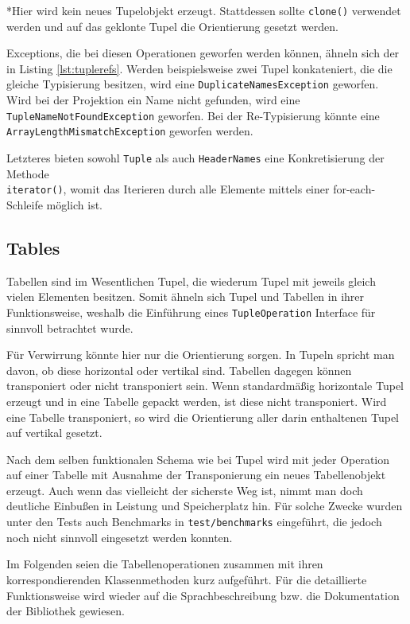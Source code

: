 *Hier wird kein neues Tupelobjekt erzeugt. Stattdessen sollte \lstinline{clone()} verwendet werden und auf das geklonte Tupel die Orientierung gesetzt werden.

Exceptions, die bei diesen Operationen geworfen werden können, ähneln sich der in Listing \ref{lst:tuplerefs}. Werden
beispielsweise zwei Tupel konkateniert, die die gleiche Typisierung besitzen, wird eine \lstinline{DuplicateNamesException} geworfen.
Wird bei der Projektion ein Name nicht gefunden, wird eine \lstinline{TupleNameNotFoundException} geworfen. Bei der Re-Typisierung
könnte eine\\
\lstinline{ArrayLengthMismatchException} geworfen werden.

Letzteres bieten sowohl \lstinline{Tuple} als auch \lstinline{HeaderNames} eine Konkretisierung der Methode\\
\lstinline{iterator()}, womit
das Iterieren durch alle Elemente mittels einer for-each-Schleife möglich ist.

\subsection{Tables}

Tabellen sind im Wesentlichen Tupel, die wiederum Tupel mit jeweils gleich vielen Elementen besitzen. Somit ähneln sich Tupel und Tabellen
in ihrer Funktionsweise, weshalb die Einführung eines \lstinline{TupleOperation} Interface für sinnvoll betrachtet wurde.

Für Verwirrung könnte hier nur die Orientierung sorgen. In Tupeln spricht man davon, ob diese horizontal oder vertikal sind.
Tabellen dagegen können transponiert oder nicht transponiert sein. Wenn standardmäßig horizontale Tupel erzeugt und in eine Tabelle
gepackt werden, ist diese nicht transponiert. Wird eine Tabelle transponiert, so wird die Orientierung aller darin enthaltenen Tupel
auf vertikal gesetzt.

Nach dem selben funktionalen Schema wie bei Tupel wird mit jeder Operation auf einer Tabelle mit Ausnahme der Transponierung
ein neues Tabellenobjekt erzeugt. Auch wenn das vielleicht der sicherste Weg ist, nimmt man doch deutliche Einbußen in Leistung
und Speicherplatz hin. Für solche Zwecke wurden unter den Tests auch Benchmarks in \texttt{test/benchmarks} eingeführt, die jedoch
noch nicht sinnvoll eingesetzt werden konnten.

Im Folgenden seien die Tabellenoperationen zusammen mit ihren korrespondierenden Klassenmethoden kurz aufgeführt.
Für die detaillierte Funktionsweise wird wieder auf die Sprachbeschreibung bzw. die Dokumentation der Bibliothek gewiesen.

